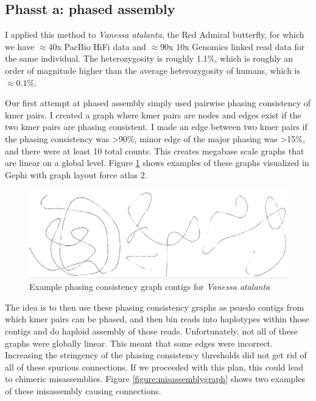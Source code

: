 {\subsection{Phasst a: phased assembly}

\par{
I applied this method to \textit{Vanessa atalanta}, the Red Admiral butterfly, for which we have $\approx$40x PacBio HiFi data and $\approx$90x 10x Genomics linked read data for the same individual. The heterozygosity is roughly 1.1\%, which is roughly an order of magnitude higher than the average heterozygosity of humans, which is $\approx0.1\%$.
} 

\par{
Our first attempt at phased assembly simply used pairwise phasing consistency of kmer pairs. I created a graph where kmer pairs are nodes and edges exist if the two kmer pairs are phasing consistent. I made an edge between two kmer pairs if the phasing consistency was >90\%, minor edge of the major phasing was >15\%, and there were at least 10 total counts. This creates megabase scale graphs that are linear on a global level. Figure \ref{figure:phasegraph} shows examples of these graphs visualized in Gephi with graph layout force atlas 2\cite{gephi}\cite{forceatlas2}. 
}

\begin{figure}[htbp!]
\caption{Example phasing consistency graph contigs for \textit{Vanessa atalanta}}
\label{figure:phasegraph}
\begin{centering}
\includegraphics[width=\textwidth]{phasinggraph.png}
\end{centering}
\end{figure}

\par{
The idea is to then use these phasing consistency graphs as psuedo contigs from which kmer pairs can be phased, and then bin reads into haplotypes within those contigs and do haploid assembly of those reads. Unfortunately, not all of these graphs were globally linear. This meant that some edges were incorrect. Increasing the stringency of the phasing consistency thresholds did not get rid of all of these spurious connections. If we proceeded with this plan, this could lead to chimeric misassemblies. Figure \ref{figure:misassemblygraph} shows two examples of these misassembly causing connections.
}

}
